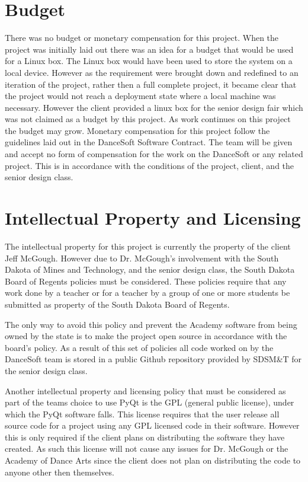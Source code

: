 \section{Budget}
There was no budget or monetary compensation for this project. When the project was initially laid out there was an idea for a budget that would be used for a Linux box. The Linux box would have been used to store the system on a local device. However as the requirement were brought down and redefined to an iteration of the project, rather then a full complete project, it became clear that the project would not reach a deployment state where a local machine was necessary. However the client provided a linux box for the senior design fair which was not claimed as a budget by this project. As work continues on this project the budget may grow.  
Monetary compensation for this project follow the guidelines laid out in the DanceSoft Software Contract. The team will be given and accept no form of compensation for the work on the DanceSoft or any related project. This is in accordance with the conditions of the project, client, and the senior design class.

\section{Intellectual Property and Licensing}
The intellectual property for this project is currently the property of the client Jeff McGough. However due to Dr. McGough's involvement with the South Dakota of Mines and Technology, and the senior design class, the South Dakota Board of Regents policies must be considered. These policies require that any work done by a teacher or for a teacher by a group of one or more students be submitted as property of the South Dakota Board of Regents.

The only way to avoid this policy and prevent the Academy software from being owned by the state is to make the project open source in accordance with the board's policy. As a result of this set of policies all code worked on by the DanceSoft team is stored in a public Github repository provided by SDSM&T for the senior design class.

Another intellectual property and licensing policy that must be considered as part of the teams choice to use PyQt is the GPL (general public license), under which the PyQt software falls. This license requires that the user release all source code for a project using any GPL licensed code in their software. However this is only required if the client plans on distributing the software they have created. As such this license will not cause any issues for Dr. McGough or the Academy of Dance Arts since the client does not plan on distributing the code to anyone other then themselves. 

